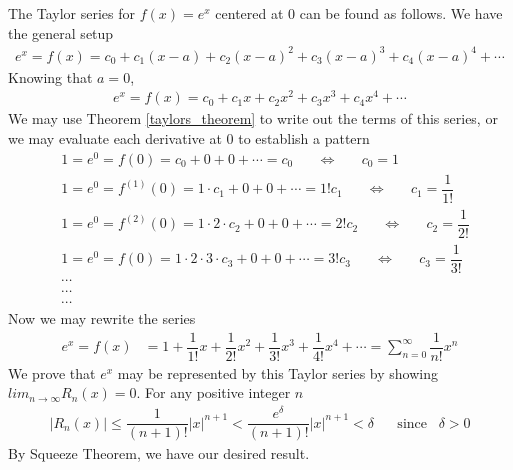 \begin{example}
The Taylor series for $f(x) = e^{x}$ centered at $0$ can be found as follows. We have the general setup
\begin{align*}
    e^{x} = f(x) = c_{0} + c_{1} (x - a) + c_{2} (x - a)^{2} + c_{3} (x - a)^{3} + c_{4} (x - a)^{4} + \cdots 
\end{align*}
Knowing that $a = 0$,
\begin{align*}
    e^{x} = f(x) = c_{0} + c_{1}x + c_{2}x^{2} + c_{3}x^{3} + c_{4}x^{4} + \cdots 
\end{align*}
We may use Theorem \ref{taylors_theorem} to write out the terms of this series, or we may evaluate each derivative at $0$ to establish a pattern
\begin{align*}
    &1 = e^{0} = f(0) = c_{0} + 0 + 0 + \cdots = c_{0} \hspace{20pt} \Longleftrightarrow \hspace{20pt} c_{0} = 1\\[2ex]
    &1 = e^{0} = f^{(1)}(0) = 1 \cdot c_{1} + 0 + 0 + \cdots = 1!c_{1} \hspace{20pt} \Longleftrightarrow \hspace{20pt} c_{1} = \dfrac{1}{1!}\\[2ex]
    &1 = e^{0} = f^{(2)}(0) = 1 \cdot 2 \cdot c_{2} + 0 + 0 + \cdots = 2!c_{2} \hspace{20pt} \Longleftrightarrow \hspace{20pt} c_{2} = \dfrac{1}{2!}\\[2ex]
    &1 = e^{0} = f(0) = 1 \cdot 2 \cdot 3 \cdot c_{3} + 0 + 0 + \cdots = 3!c_{3} \hspace{20pt} \Longleftrightarrow \hspace{20pt} c_{3} = \dfrac{1}{3!}\\[1ex]
    &\cdots\\[1ex]
    &\cdots\\[1ex]
    &\cdots
\end{align*}
Now we may rewrite the series
\begin{align*}
    e^{x} = f(x) &= 1 + \dfrac{1}{1!}x + \dfrac{1}{2!}x^{2} + \dfrac{1}{3!}x^{3} + \dfrac{1}{4!}x^{4} + \cdots = \sum_{n=0}^{\infty} \dfrac{1}{n!}x^{n}
\end{align*}
We prove that $e^{x}$ may be represented by this Taylor series by showing $lim_{n \longrightarrow \infty}R_{n}(x) = 0$. For any positive integer $n$
\begin{align*}
    \lvert R_{n}(x) \rvert \leq \dfrac{1}{(n+1)!} \lvert x \rvert^{n+1} < \dfrac{e^{\delta}}{(n+1)!} \lvert x \rvert^{n+1} < \delta \hspace{20pt} \text{since} \hspace{10pt} \delta > 0
\end{align*}
By Squeeze Theorem, we have our desired result.
\end{example}


